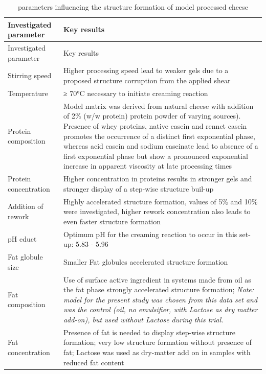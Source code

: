 \documentclass[
]{article}
\begin{document}
\begin{longtable}[]{@{}
  >{\raggedright\arraybackslash}p{}
  >{\raggedright\arraybackslash}p{}@{}}
\caption{parameters influencing the structure formation of model
processed cheese}\tabularnewline
\toprule
Investigated parameter & Key results \\
\midrule
\endfirsthead
\toprule
Investigated parameter & Key results \\
\midrule
\endhead
Stirring speed & Higher processing speed lead to weaker gels due to a
proposed structure corruption from the applied shear \\
Temperature & ≥ 70°C necessary to initiate creaming reaction \\
Protein composition & Model matrix was derived from natural cheese with
addition of 2\% (w/w protein) protein powder of varying sources).
Presence of whey proteins, native casein and rennet casein promotes the
occurrence of a distinct first exponential phase, whereas acid casein
and sodium caseinate lead to absence of a first exponential phase but
show a pronounced exponential increase in apparent viscosity at late
processing times \\
Protein concentration & Higher concentration in proteins results in
stronger gels and stronger display of a step-wise structure buil-up \\
Addition of rework & Highly accelerated structure formation, values of
5\% and 10\% were investigated, higher rework concentration also leads
to even faster structure formation \\
pH educt & Optimum pH for the creaming reaction to occur in this set-up:
5.83 - 5.96 \\
Fat globule size & Smaller Fat globules accelerated structure
formation \\
Fat composition & Use of surface active ingredient in systems made from
oil as the fat phase strongly accelerated structure formation;
\emph{Note: model for the present study was chosen from this data set
and was the control (oil, no emulsifier, with Lactose as dry matter
add-on), but used without Lactose during this trial.} \\
Fat concentration & Presence of fat is needed to display step-wise
structure formation; very low structure formation without presence of
fat; Lactose was used as dry-matter add on in samples with reduced fat
content \\
\bottomrule
\end{longtable}
\end{document}
